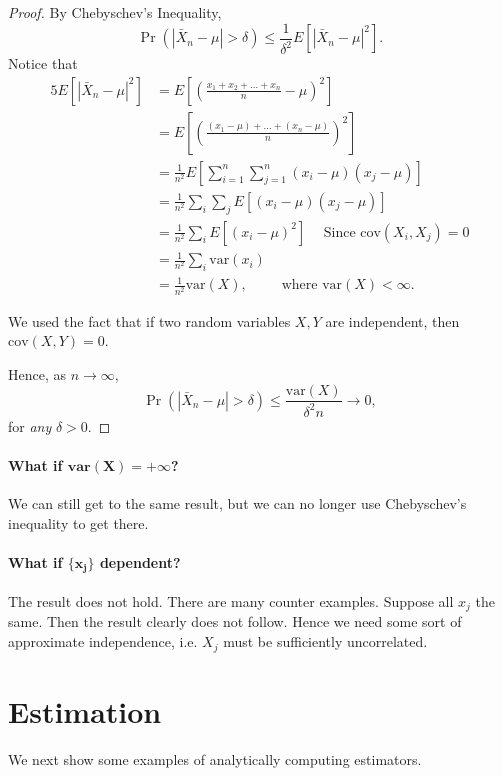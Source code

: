 \documentclass[12pt]{article}\usepackage[]{graphicx}\usepackage[]{color}
\begin{document}
\begin{proof}   By Chebyschev's Inequality,
  \[
    \Pr(|\bar{X}_n - \mu| > \delta) \leq \frac{1}{\delta^2} E\left[ |\bar{X}_n - \mu|^2 \right].
  \]
  Notice that
  \begin{alignat*}{5}     
    E\left[ |\bar{X}_n - \mu|^2 \right]
    &= E \left[ \left(\frac{x_1 + x_2 + \ldots + x_n}{n} - \mu \right)^2 \right] \\
    &= E \left[ \left( \frac{(x_1 - \mu) + \ldots + (x_n - \mu)}{n}\right)^2 \right] \\
    &= \frac{1}{n^2} E \left[ \sum_{i=1}^n \sum_{j=1}^n (x_i - \mu) (x_j - \mu) \right] \\
    &= \frac{1}{n^2} \sum_{i} \sum_{j} E \left[ (x_i - \mu) (x_j - \mu)\right] \\
    &= \frac{1}{n^2} \sum_i E[(x_i-\mu)^2] \hspace{15pt} \textrm{Since } \textrm{cov}(X_i,X_j)=0\\
    &= \frac{1}{n^2} \sum_i \textrm{var}(x_i) \\
    &= \frac{1}{n^2} \textrm{var}(X), \hspace{25pt} \textrm{ where } \textrm{var}(X) < \infty. \end{alignat*}

We used the fact that if two random variables $X,Y$ are independent,
then $\textrm{cov}(X,Y) = 0$.

Hence, as $n\longrightarrow \infty$,
\[
\Pr( |\bar{X}_n - \mu| > \delta) \leq \frac{\textrm{var}(X)}{\delta^2 n} \longrightarrow 0,
\]
for \emph{any} $\delta > 0$. \end{proof}

\paragraph{What if $\pmb{\textrm{var}(X) = + \infty}$?} We can still get to the same result, but we can no longer use Chebyschev's inequality to get there.

\paragraph{What if $\pmb{\{x_j\}}$ dependent?} The result does not hold. There are many counter examples. Suppose all $x_j$ the same. Then the result clearly
does not follow. Hence we need some sort of approximate independence,
i.e. $X_j$ must be sufficiently uncorrelated.

\section{Estimation}
We next show some examples of analytically computing estimators.
\end{document}
